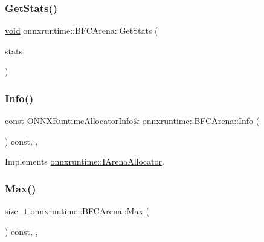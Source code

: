 \mbox{\label{classonnxruntime_1_1BFCArena_a3ca0c91d197bf7f3f2ee0859c62a44e5}} 
\subsubsection{\texorpdfstring{Get\+Stats()}{GetStats()}}
{\footnotesize\ttfamily \mbox{\hyperlink{mlasi_8h_a88f941d423cb2a819b70a1358982b1a6}{void}} onnxruntime\+::\+B\+F\+C\+Arena\+::\+Get\+Stats (\begin{DoxyParamCaption}\item[{\mbox{\hyperlink{structonnxruntime_1_1AllocatorStats}{Allocator\+Stats}} $\ast$}]{stats }\end{DoxyParamCaption})}

\mbox{\label{classonnxruntime_1_1BFCArena_acf4fc8182c636a16d62e80cf051da0e2}} 
\subsubsection{\texorpdfstring{Info()}{Info()}}
{\footnotesize\ttfamily const \mbox{\hyperlink{structONNXRuntimeAllocatorInfo}{O\+N\+N\+X\+Runtime\+Allocator\+Info}}\& onnxruntime\+::\+B\+F\+C\+Arena\+::\+Info (\begin{DoxyParamCaption}{ }\end{DoxyParamCaption}) const\hspace{0.3cm}{\ttfamily [inline]}, {\ttfamily [override]}, {\ttfamily [virtual]}}



Implements \mbox{\hyperlink{classonnxruntime_1_1IArenaAllocator_a4eb52bb1236cf59aec91161156286ba0}{onnxruntime\+::\+I\+Arena\+Allocator}}.

\mbox{\label{classonnxruntime_1_1BFCArena_a86661567f79140806c715e5abe56040a}} 
\subsubsection{\texorpdfstring{Max()}{Max()}}
{\footnotesize\ttfamily \mbox{\hyperlink{mlasi_8h_a503efbc1c6e50825320ad909366b78ab}{size\+\_\+t}} onnxruntime\+::\+B\+F\+C\+Arena\+::\+Max (\begin{DoxyParamCaption}{ }\end{DoxyParamCaption}) const\hspace{0.3cm}{\ttfamily [inline]}, {\ttfamily [override]}, {\ttfamily [virtual]}}




